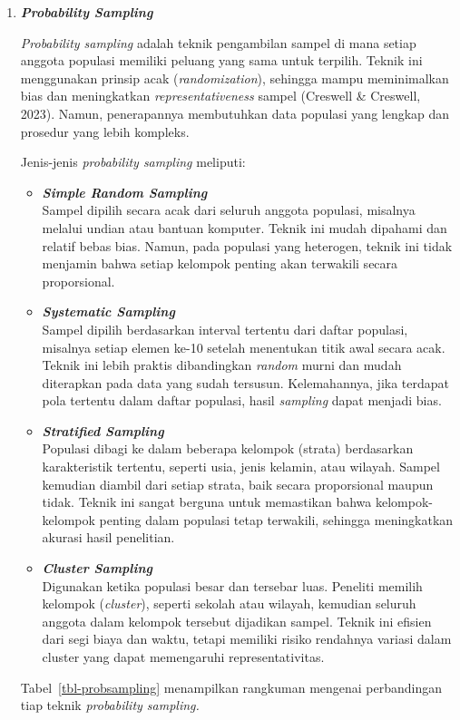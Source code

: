 \documentclass[
  indonesian,
  letterpaper,
  DIV=11,
  numbers=noendperiod]{scrreprt}
\providecommand{\tightlist}{%
  \setlength{\itemsep}{0pt}\setlength{\parskip}{0pt}}
\begin{document}
\begin{enumerate}
\def\labelenumi{\alph{enumi}.}
\item
  \textbf{\emph{Probability Sampling}}

  \emph{Probability sampling} adalah teknik pengambilan sampel di mana
  setiap anggota populasi memiliki peluang yang sama untuk terpilih.
  Teknik ini menggunakan prinsip acak (\emph{randomization}), sehingga
  mampu meminimalkan bias dan meningkatkan \emph{representativeness}
  sampel (Creswell \& Creswell, 2023). Namun, penerapannya membutuhkan
  data populasi yang lengkap dan prosedur yang lebih kompleks.

  Jenis-jenis \emph{probability sampling} meliputi:

  \begin{itemize}
  \tightlist
  \item
    \textbf{\emph{Simple Random Sampling}}\\
    Sampel dipilih secara acak dari seluruh anggota populasi, misalnya
    melalui undian atau bantuan komputer. Teknik ini mudah dipahami dan
    relatif bebas bias. Namun, pada populasi yang heterogen, teknik ini
    tidak menjamin bahwa setiap kelompok penting akan terwakili secara
    proporsional.
  \item
    \textbf{\emph{Systematic Sampling}}\\
    Sampel dipilih berdasarkan interval tertentu dari daftar populasi,
    misalnya setiap elemen ke-10 setelah menentukan titik awal secara
    acak. Teknik ini lebih praktis dibandingkan \emph{random} murni dan
    mudah diterapkan pada data yang sudah tersusun. Kelemahannya, jika
    terdapat pola tertentu dalam daftar populasi, hasil \emph{sampling}
    dapat menjadi bias.
  \item
    \textbf{\emph{Stratified Sampling}}\\
    Populasi dibagi ke dalam beberapa kelompok (strata) berdasarkan
    karakteristik tertentu, seperti usia, jenis kelamin, atau wilayah.
    Sampel kemudian diambil dari setiap strata, baik secara proporsional
    maupun tidak. Teknik ini sangat berguna untuk memastikan bahwa
    kelompok-kelompok penting dalam populasi tetap terwakili, sehingga
    meningkatkan akurasi hasil penelitian.
  \item
    \textbf{\emph{Cluster Sampling}}\\
    Digunakan ketika populasi besar dan tersebar luas. Peneliti memilih
    kelompok (\emph{cluster}), seperti sekolah atau wilayah, kemudian
    seluruh anggota dalam kelompok tersebut dijadikan sampel. Teknik ini
    efisien dari segi biaya dan waktu, tetapi memiliki risiko rendahnya
    variasi dalam cluster yang dapat memengaruhi representativitas.
  \end{itemize}

  Tabel~\ref{tbl-probsampling} menampilkan rangkuman mengenai
  perbandingan tiap teknik \emph{probability sampling.}
\end{enumerate}
\end{document}
